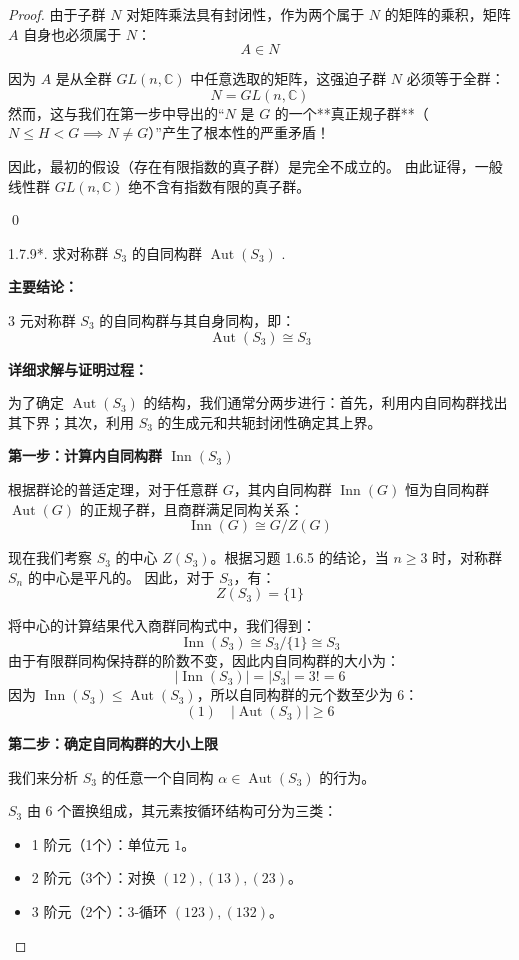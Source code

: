 \documentclass[]{article}
\begin{document}
\begin{proof}
由于子群 $N$ 对矩阵乘法具有封闭性，作为两个属于 $N$ 的矩阵的乘积，矩阵 $A$ 自身也必须属于 $N$：
\[ A \in N \]

因为 $A$ 是从全群 $GL(n, \mathbb{C})$ 中任意选取的矩阵，这强迫子群 $N$ 必须等于全群：
\[ N = GL(n, \mathbb{C}) \]
然而，这与我们在第一步中导出的“$N$ 是 $G$ 的一个**真正规子群**（$N \leqslant H < G \implies N \neq G$）”产生了根本性的严重矛盾！

因此，最初的假设（存在有限指数的真子群）是完全不成立的。
由此证得，一般线性群 $GL(n, \mathbb{C})$ 绝不含有指数有限的真子群。

\qed

1.7.9*. 求对称群 $S_{3}$ 的自同构群 $\operatorname{Aut}(S_3)$ . 

\bigskip
\noindent \textbf{主要结论：} 

3 元对称群 $S_3$ 的自同构群与其自身同构，即：
\[ \operatorname{Aut}(S_3) \cong S_3 \]

\bigskip
\noindent \textbf{详细求解与证明过程：} 

为了确定 $\operatorname{Aut}(S_3)$ 的结构，我们通常分两步进行：首先，利用内自同构群找出其下界；其次，利用 $S_3$ 的生成元和共轭封闭性确定其上界。

\bigskip
\noindent \textbf{第一步：计算内自同构群 $\operatorname{Inn}(S_3)$}

根据群论的普适定理，对于任意群 $G$，其内自同构群 $\operatorname{Inn}(G)$ 恒为自同构群 $\operatorname{Aut}(G)$ 的正规子群，且商群满足同构关系：
\[ \operatorname{Inn}(G) \cong G/Z(G) \]

现在我们考察 $S_3$ 的中心 $Z(S_3)$。根据习题 1.6.5 的结论，当 $n \ge 3$ 时，对称群 $S_n$ 的中心是平凡的。
因此，对于 $S_3$，有：
\[ Z(S_3) = \{1\} \]

将中心的计算结果代入商群同构式中，我们得到：
\[ \operatorname{Inn}(S_3) \cong S_3/\{1\} \cong S_3 \]
由于有限群同构保持群的阶数不变，因此内自同构群的大小为：
\[ |\operatorname{Inn}(S_3)| = |S_3| = 3! = 6 \]
因为 $\operatorname{Inn}(S_3) \leqslant \operatorname{Aut}(S_3)$，所以自同构群的元个数至少为 6：
\[ (1) \quad |\operatorname{Aut}(S_3)| \geqslant 6 \]

\bigskip
\noindent \textbf{第二步：确定自同构群的大小上限}

我们来分析 $S_3$ 的任意一个自同构 $\alpha \in \operatorname{Aut}(S_3)$ 的行为。

$S_3$ 由 6 个置换组成，其元素按循环结构可分为三类：
\begin{itemize}
	\item 1 阶元（1个）：单位元 $1$。
	\item 2 阶元（3个）：对换 $(12), (13), (23)$。
	\item 3 阶元（2个）：3-循环 $(123), (132)$。
\end{itemize}


\end{proof}
\end{document}
